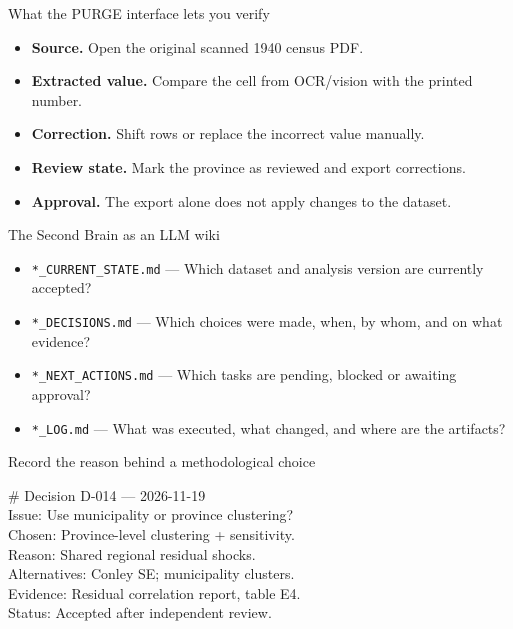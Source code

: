 \begin{frame}{What the PURGE interface lets you verify}
\begin{itemize}\setlength{\itemsep}{0.32em}
\item \textbf{Source.} Open the original scanned 1940 census PDF.
\item \textbf{Extracted value.} Compare the cell from OCR/vision with the printed number.
\item \textbf{Correction.} Shift rows or replace the incorrect value manually.
\item \textbf{Review state.} Mark the province as reviewed and export corrections.
\item \textbf{Approval.} The export alone does not apply changes to the dataset.
\end{itemize}
\end{frame}

\begin{frame}{The Second Brain as an LLM wiki}
\begin{itemize}\setlength{\itemsep}{0.42em}
\item \texttt{*\_CURRENT\_STATE.md} --- Which dataset and analysis version are currently accepted?
\item \texttt{*\_DECISIONS.md} --- Which choices were made, when, by whom, and on what evidence?
\item \texttt{*\_NEXT\_ACTIONS.md} --- Which tasks are pending, blocked or awaiting approval?
\item \texttt{*\_LOG.md} --- What was executed, what changed, and where are the artifacts?
\end{itemize}
\end{frame}

\begin{frame}{Record the reason behind a methodological choice}
\begin{tcolorbox}[l2base]
{\ttfamily\small
\# Decision D-014 — 2026-11-19\\
Issue: Use municipality or province clustering?\\
Chosen: Province-level clustering + sensitivity.\\
Reason: Shared regional residual shocks.\\
Alternatives: Conley SE; municipality clusters.\\
Evidence: Residual correlation report, table E4.\\
Status: Accepted after independent review.\par}
\end{tcolorbox}
\end{frame}

